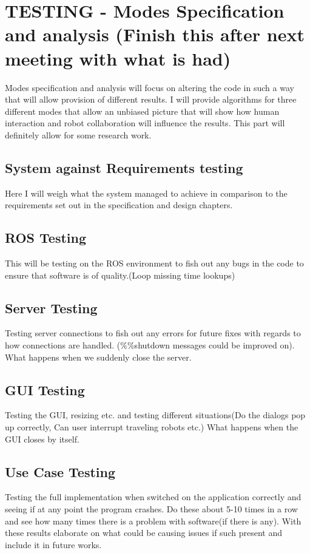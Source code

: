 \documentclass{report}
\begin{document}
  \chapter{TESTING - Modes Specification and analysis (Finish this after next meeting with what is had)}
    Modes specification and analysis will focus on altering the code in such a way that will allow provision of different results. I will provide algorithms for three different modes that allow an unbiased picture that will show how human interaction and robot collaboration will influence the results. This part will definitely allow for some research work.

    \section{System against Requirements testing}
      Here I will weigh what the system managed to achieve in comparison to the requirements set out in the specification and design chapters.
    \section{ROS Testing}
      This will be testing on the ROS environment to fish out any bugs in the code to ensure that software is of quality.(Loop missing time lookups)
    \section{Server Testing}
      Testing server connections to fish out any errors for future fixes with regards to how connections are handled. (\%\%shutdown messages could be improved on). What happens when we suddenly close the server.
    \section{GUI Testing}
      Testing the GUI, resizing etc. and testing different situations(Do the dialogs pop up correctly, Can user interrupt traveling robots etc.) What happens when the GUI closes by itself.
    \section{Use Case Testing}
      Testing the full implementation when switched on the application correctly and seeing if at any point the program crashes. Do these about 5-10 times in a row and see how many times there is a problem with software(if there is any). With these results elaborate on what could be causing issues if such present and include it in future works.
\end{document}
